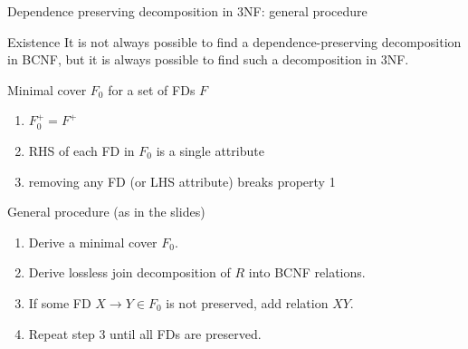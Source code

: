 \documentclass[10pt,aspectratio=169]{beamer}
\begin{document}
\begin{frame}{Dependence preserving decomposition in 3NF: general procedure}
\begin{alertblock}{Existence}
It is not always possible to find a dependence-preserving decomposition in BCNF,
but it is always possible to find such a decomposition in 3NF.
\end{alertblock}

\begin{block}{Minimal cover \(F_0\) for a set of FDs \(F\)}
\begin{enumerate}
  \item \(F_0^+ = F^+\)
  \item RHS of each FD in \(F_0\) is a single attribute
  \item removing any FD (or LHS attribute) breaks property 1
\end{enumerate}
\end{block}

\begin{block}{General procedure (as in the slides)}
\begin{enumerate}
  \item Derive a minimal cover \(F_0\).
  \item Derive lossless join decomposition of \(R\) into BCNF relations.
  \item If some FD \(X\rightarrow Y \in F_0\) is not preserved, add relation \(XY\).
  \item Repeat step 3 until all FDs are preserved.
\end{enumerate}
\end{block}
\end{frame}
\end{document}
